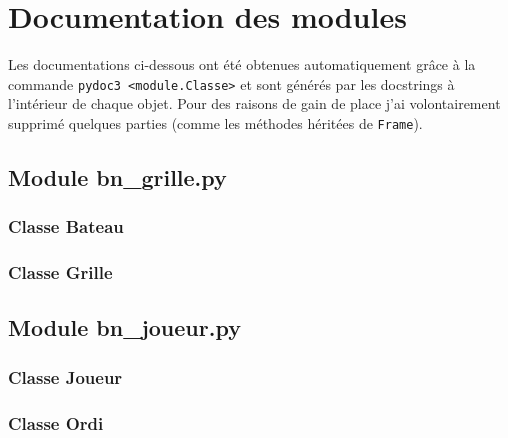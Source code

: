 \chapter{Documentation des modules}

Les documentations ci-dessous ont été obtenues automatiquement grâce à la commande \texttt{pydoc3 <module.Classe>} et sont générés par les docstrings à l'intérieur de chaque objet. 
%
Pour des raisons de gain de place j'ai volontairement supprimé quelques parties (comme les méthodes héritées de \texttt{Frame}).
\section{Module bn\_grille.py}
\subsection{Classe Bateau}
\immediate{}


\newpage

\subsection{Classe Grille}


\section{Module bn\_joueur.py}
\subsection{Classe Joueur}


\subsection{Classe Ordi}


